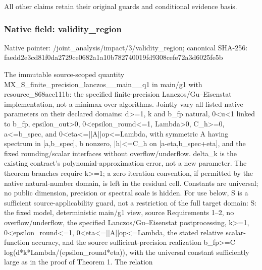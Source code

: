 \documentclass[10pt,a4paper]{article}
\begin{document}
\begingroup\raggedright\sloppy All other claims retain their original guards and conditional evidence basis.\par\endgroup

\subsubsection{Native field: validity\_\allowbreak{}region}
Native pointer: /joint\_\allowbreak{}analysis/impact/3/validity\_\allowbreak{}region; canonical SHA-256: faedd2e3cd81f0da2729ce0682a1a10b782740019fd9308cefe72a3d6025fe5b

\begingroup\raggedright\sloppy The immutable source-scoped quantity MX\_\allowbreak{}S\_\allowbreak{}finite\_\allowbreak{}precision\_\allowbreak{}lanczos\_\allowbreak{}\_\allowbreak{}main\_\allowbreak{}\_\allowbreak{}q1 in main/\allowbreak{}g1 with resource\_\allowbreak{}868aec111b:\allowbreak{} the specified finite-precision Lanczos/\allowbreak{}Gu{\AtlasUnicodeText –}\allowbreak{}Eisenstat implementation,\allowbreak{} not a minimax over algorithms. Jointly vary all listed native parameters on their declared domains:\allowbreak{} d>=\allowbreak{}1,\allowbreak{} k and b\_\allowbreak{}fp natural,\allowbreak{} 0<u<1 linked to b\_\allowbreak{}fp,\allowbreak{} epsilon\_\allowbreak{}out>0,\allowbreak{} 0<epsilon\_\allowbreak{}round<=\allowbreak{}1,\allowbreak{} Lambda>0,\allowbreak{} C\_\allowbreak{}h>=\allowbreak{}0,\allowbreak{} a<=\allowbreak{}b\_\allowbreak{}spec,\allowbreak{} and 0<eta<=\allowbreak{}||A||op<=\allowbreak{}Lambda,\allowbreak{} with symmetric A having spectrum in [a,\allowbreak{}b\_\allowbreak{}spec],\allowbreak{} b nonzero,\allowbreak{} |h|<=\allowbreak{}C\_\allowbreak{}h on [a-eta,\allowbreak{}b\_\allowbreak{}spec+eta],\allowbreak{} and the fixed rounding/\allowbreak{}scalar interfaces without overflow/\allowbreak{}underflow. delta\_\allowbreak{}k is the existing contract's polynomial-approximation error,\allowbreak{} not a new parameter. The theorem branches require k>=\allowbreak{}1;\allowbreak{} a zero iteration convention,\allowbreak{} if permitted by the native natural-number domain,\allowbreak{} is left in the residual cell. Constants are universal;\allowbreak{} no public dimension,\allowbreak{} precision or spectral scale is hidden. For use below,\allowbreak{} S is a sufficient source-applicability guard,\allowbreak{} not a restriction of the full target domain:\allowbreak{} S:\allowbreak{} the fixed model,\allowbreak{} deterministic main/\allowbreak{}g1 view,\allowbreak{} source Requirements 1{\AtlasUnicodeText –}\allowbreak{}2,\allowbreak{} no overflow/\allowbreak{}underflow,\allowbreak{} the specified Lanczos/\allowbreak{}Gu{\AtlasUnicodeText –}\allowbreak{}Eisenstat postprocessing,\allowbreak{} k>=\allowbreak{}1,\allowbreak{} 0<epsilon\_\allowbreak{}round<=\allowbreak{}1,\allowbreak{} 0<eta<=\allowbreak{}||A||op<=\allowbreak{}Lambda,\allowbreak{} the stated relative scalar-function accuracy,\allowbreak{} and the source sufficient-precision realization b\_\allowbreak{}fp>=\allowbreak{}C log(d*k*Lambda/\allowbreak{}(epsilon\_\allowbreak{}round*eta)),\allowbreak{} with the universal constant sufficiently large as in the proof of Theorem 1. The relation 
\end{document}
